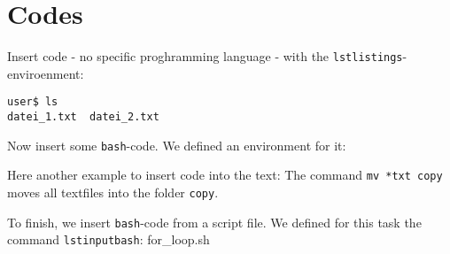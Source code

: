 \documentclass[12pt, ngerman]{scrartcl}
\newcommand{\lstinputbash}{}
\begin{document}
%
\section{Codes}
Insert code - no specific proghramming language - with the
\texttt{lstlistings}-enviroenment:
%
\begin{lstlisting}
user$ ls
datei_1.txt  datei_2.txt
\end{lstlisting}
%
Now insert some \texttt{bash}-code. We defined an environment for it:
%
%
Here another example to insert code into the text:
The command
\lstinline{mv *txt copy} moves all textfiles into the folder
\lstinline{copy}.

To finish, we insert \texttt{bash}-code from a script file. We defined for this task
the command \texttt{lstinputbash}:
%
\lstinputbash{for_loop.sh}
\end{document}
